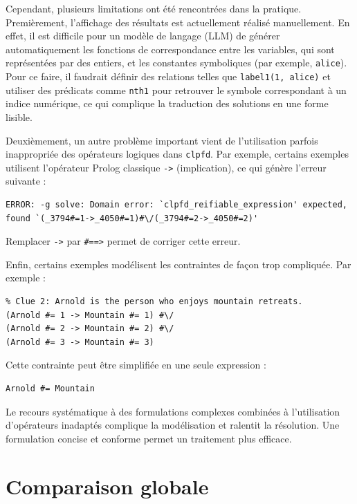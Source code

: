 \documentclass[a4paper,11pt]{article}
\begin{document}
Cependant, plusieurs limitations ont été rencontrées dans la pratique. Premièrement, l'affichage des résultats est actuellement réalisé manuellement. En effet, il est difficile pour un modèle de langage (LLM) de générer automatiquement les fonctions de correspondance entre les variables, qui sont représentées par des entiers, et les constantes symboliques (par exemple, \texttt{alice}). Pour ce faire, il faudrait définir des relations telles que \texttt{label1(1, alice)} et utiliser des prédicats comme \texttt{nth1} pour retrouver le symbole correspondant à un indice numérique, ce qui complique la traduction des solutions en une forme lisible.

Deuxièmement, un autre problème important vient de l'utilisation parfois inappropriée des opérateurs logiques dans \texttt{clpfd}. Par exemple, certains exemples utilisent l'opérateur Prolog classique \texttt{->} (implication), ce qui génère l'erreur suivante :

\begin{verbatim}
ERROR: -g solve: Domain error: `clpfd_reifiable_expression' expected,
found `(_3794#=1->_4050#=1)#\/(_3794#=2->_4050#=2)'
\end{verbatim}

Remplacer \texttt{->} par \texttt{\#==>} permet de corriger cette erreur.

Enfin, certains exemples modélisent les contraintes de façon trop compliquée. Par exemple :

\begin{verbatim}
% Clue 2: Arnold is the person who enjoys mountain retreats.
(Arnold #= 1 -> Mountain #= 1) #\/
(Arnold #= 2 -> Mountain #= 2) #\/
(Arnold #= 3 -> Mountain #= 3)
\end{verbatim}

Cette contrainte peut être simplifiée en une seule expression :

\begin{verbatim}
Arnold #= Mountain
\end{verbatim}

Le recours systématique à des formulations complexes combinées à l'utilisation d'opérateurs inadaptés complique la modélisation et ralentit la résolution. Une formulation concise et conforme permet un traitement plus efficace.



\section{Comparaison globale}
\end{document}
